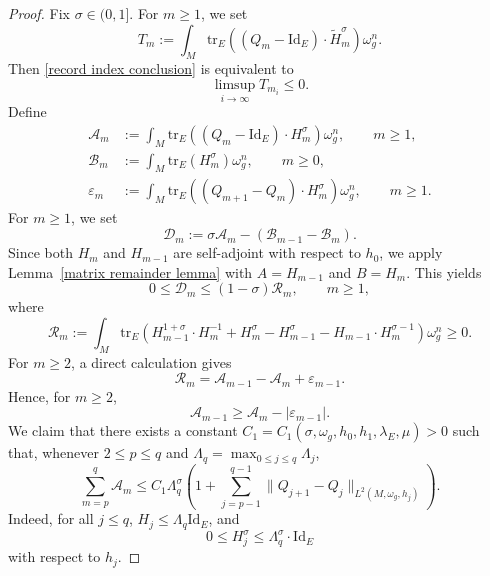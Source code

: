 \documentclass[12pt, reqno]{amsart}
\newcommand\cA{{\mathcal A}}
\newcommand\cB{{\mathcal B}}
\newcommand\cD{{\mathcal D}}
\newcommand\cR{{\mathcal R}}
\newcommand{\id}{\mathrm{Id}}
\theoremstyle{plain}
\theoremstyle{definition}
\newcommand{\beq}{\begin{equation}}
\newcommand{\eeq}{\end{equation}}
\renewcommand{\tilde}{\widetilde}
\renewcommand{\>}{\rightarrow}
\newcommand{\om}{\omega}
\newcommand{\tr}{\mathrm{tr}}
\numberwithin{equation}{section}
\begin{document}
\begin{proof}
	Fix $\sigma\in(0,1]$.   For $m\geq1$, we set
	\beq
	T_m:=\int_M\tr_E\left((Q_m-\id_E)\cdot\tilde H_m^\sigma\right)\omega_g^n.
	\eeq
	Then \eqref{record index conclusion} is equivalent to
	\beq
	\limsup_{i\to\infty}T_{m_i}\leq0.
	\label{T record index conclusion}
	\eeq
	Define
	\begin{align}
	\cA_m&:=\int_M\tr_E\left(\left(Q_m-\id_E\right)\cdot H_m^\sigma\right)\omega_g^n,
	\qquad m\geq1,\label{A m definition}\\
	\cB_m&:=\int_M\tr_E\left(H_m^\sigma\right)\omega_g^n,
	\qquad m\geq0,\label{B m definition}\\
	\varepsilon_m&:=\int_M\tr_E\left(\left(Q_{m+1}-Q_m\right)\cdot H_m^\sigma\right)\omega_g^n,
	\qquad m\geq1.\label{epsilon m definition}
	\end{align}
	For $m\geq1$,  we set
	\begin{equation}
	\cD_m:=\sigma\cA_m-(\cB_{m-1}-\cB_m).
	\label{D m definition}
	\end{equation}
	Since both $H_m$ and $H_{m-1}$ are self-adjoint with respect to $h_0$, we  apply Lemma~\ref{matrix remainder lemma}  with $A=H_{m-1}$ and $B=H_m$. This yields
	\begin{equation}
	0\leq\cD_m\leq(1-\sigma)\cR_m,\qquad m\geq1,
	\label{D R m inequality}
	\end{equation}
	where
	\[
	\cR_m:=\int_M\tr_E\left(
	H_{m-1}^{1+\sigma}\cdot H_m^{-1}+H_m^\sigma
	-H_{m-1}^\sigma-H_{m-1}\cdot H_m^{\sigma-1}
	\right)\omega_g^n\geq0.
	\]
	For $m\geq2$, a direct calculation gives
	\begin{equation}
	\cR_m=\cA_{m-1}-\cA_m+\varepsilon_{m-1}.
	\label{R m telescoping identity}
	\end{equation}
	Hence, for $m\geq2$,
	\begin{equation}
	\cA_{m-1}\geq\cA_m-|\varepsilon_{m-1}|.
	\label{backward propagation inequality}
	\end{equation}
	We claim that there exists a constant
	$C_1=C_1(\sigma,\omega_g,h_0,h_1,\lambda_E,\mu)>0$ such that, whenever
	$2\leq p\leq q$ and
	$\Lambda_q=\max_{0\leq j\leq q}\Lambda_j$,
	\begin{equation}
	\sum_{m=p}^q\cA_m
	\leq C_1\Lambda_q^\sigma
	\left(1+\sum_{j=p-1}^{q-1}
	\|Q_{j+1}-Q_j\|_{L^2(M,\om_g,h_j)}\right).
	\label{A sum upper bound}
	\end{equation}
	Indeed,  for all $j\leq q$, $H_j\leq\Lambda_q\id_E$, and
	\beq 
	0\leq H_j^\sigma\leq\Lambda_q^\sigma\cdot\id_E
	\eeq 
	with respect to $h_j$.

\end{proof}
\end{document}
